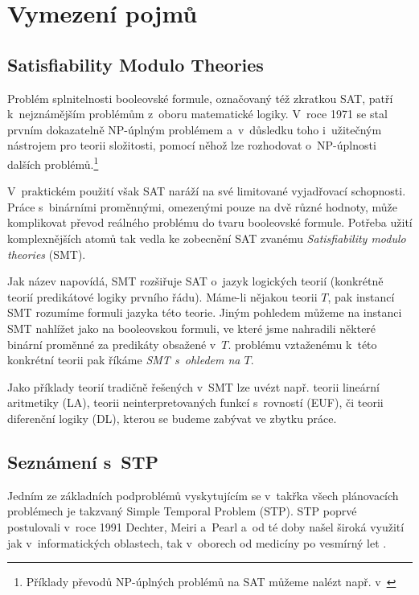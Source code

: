 \chapter{Vymezení pojmů}

\section{Satisfiability Modulo Theories}

Problém splnitelnosti booleovské formule, označovaný též zkratkou SAT, patří k~nejznámějším problémům z~oboru matematické logiky. V~roce 1971 se stal prvním dokazatelně NP-úplným problémem \cite{Cook71} a~v~důsledku toho i~užitečným nástrojem pro teorii složitosti, pomocí něhož lze rozhodovat o~NP-úplnosti dalších problémů.\footnote{Příklady převodů NP-úplných problémů na SAT můžeme nalézt např. v~\cite[kapitola 19]{Mares17}}

V~praktickém použití však SAT naráží na své limitované vyjadřovací schopnosti. Práce s~binárními proměnnými, omezenými pouze na dvě různé hodnoty, může komplikovat převod reálného problému do tvaru booleovské formule. Potřeba užití komplexnějších atomů tak vedla ke zobecnění SAT zvanému \emph{Satisfiability modulo theories} (SMT).

Jak název napovídá, SMT rozšiřuje SAT o~jazyk logických teorií (konkrétně teorií predikátové logiky prvního řádu). Máme-li nějakou teorii $T$, pak instancí SMT rozumíme formuli jazyka této teorie. Jiným pohledem můžeme na instanci SMT nahlížet jako na booleovskou formuli, ve které jsme nahradili některé binární proměnné za predikáty obsažené v~$T$. problému vztaženému k~této konkrétní teorii pak říkáme \emph{SMT s~ohledem na $T$}.

Jako příklady teorií tradičně řešených v~SMT lze uvézt např. teorii lineární aritmetiky (LA), teorii neinterpretovaných funkcí s~rovností (EUF), či teorii diferenční logiky (DL), kterou se budeme zabývat ve zbytku práce.

\section{Seznámení s~STP}\label{stp}

Jedním ze základních podproblémů vyskytujícím se v~takřka všech plánovacích problémech je takzvaný Simple Temporal Problem (STP). STP poprvé postulovali v~roce 1991 Dechter, Meiri a~Pearl \cite{Dechter91} a~od té doby našel široká využití jak v~informatických oblastech, tak v~oborech od medicíny \cite{Anselma06} po vesmírný let \cite{Fukunaga97}.

